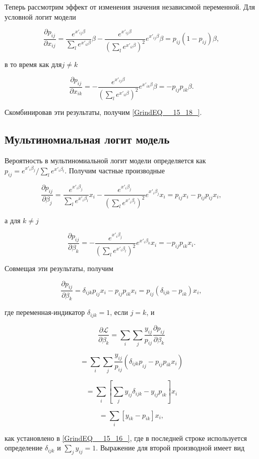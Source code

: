 Теперь рассмотрим эффект от изменения значения независимой переменной. Для условной логит модели

\[\frac{\partial p_{ij}}{\partial x_{ij}}=\frac{e^{x'_{ij}\beta }}{\sum_l{e^{x'_{il}\beta }}}\beta -\frac{e^{x'_{ij}\beta }}{{\left(\sum_l{e^{x'_{il}\beta }}\right)}^2}e^{x'_{ij}\beta }\beta =p_{ij}\left(1-p_{ij}\right)\beta ,\] 

в то время как для$j\ne k$

\[\frac{\partial p_{ij}}{\partial x_{ik}}=-\frac{e^{x'_{ij}\beta }}{{\left(\sum_l{e^{x'_{il}\beta }}\right)}^2}e^{x'_{ik}\beta }\beta =-p_{ij}p_{ik}\beta .\] 

Скомбинировав эти результаты, получим \eqref{GrindEQ__15_18_}.

\subsection{Мультиномиальная логит модель}

Вероятность в мультиномиальной логит модели определяется как $p_{ij}={e^{x'_i{\beta }_j}}/{\sum_l{e^{x'_i{\beta }_l}}}$. Получим частные производные

\[\frac{\partial p_{ij}}{\partial {\beta }_j}=\frac{e^{x'_i{\beta }_j}}{\sum_l{e^{x'_i{\beta }_l}}}x_i-\frac{e^{x'_i{\beta }_j}}{{\left(\sum_l{e^{x'_i{\beta }_l}}\right)}^2}e^{x'_i{\beta }_j}x_i=p_{ij}x_i-p_{ij}p_{ij}x_i,\] 

а для $k\ne j$

\[\frac{\partial p_{ij}}{\partial {\beta }_k}=-\frac{e^{x'_i{\beta }_j}}{{\left(\sum_l{e^{x'_i{\beta }_l}}\right)}^2}e^{x'_i{\beta }_k}x_i=-p_{ij}p_{ik}x_i.\] 

Совмещая эти результаты, получим

\[\frac{\partial p_{ij}}{\partial {\beta }_k}={\delta }_{ijk}p_{ij}x_i-p_{ij}p_{ik}x_i=p_{ij}\left({\delta }_{ijk}-p_{ik}\right)x_i,\] 

где переменная-индикатор ${\delta }_{ijk}=1$, если $j=k$, и

\[\frac{\partial {\mathcal L}}{\partial {\beta }_k}=\sum_i{\sum_j{\frac{y_{ij}}{p_{ij}}\frac{\partial p_{ij}}{\partial {\beta }_k}}}\] 

\[=\sum_i{\sum_j{\frac{y_{ij}}{p_{ij}}\left({{\delta }_{ijk}p}_{ij}-p_{ij}p_{ik}x_i\right)}}\] 

\[=\sum_i{\left[\sum_j{y_{ij}{\delta }_{ijk}-y_{ij}p_{ik}}\right]x_i}\] 

\[=\sum_i{[y_{ik}-p_{ik}]}x_i,\] 

как установлено в \eqref{GrindEQ__15_16_}, где в последней строке используется определение ${\delta }_{ijk}$ и $\sum_j{y_{ij}=1}$. Выражение для второй производной имеет вид

